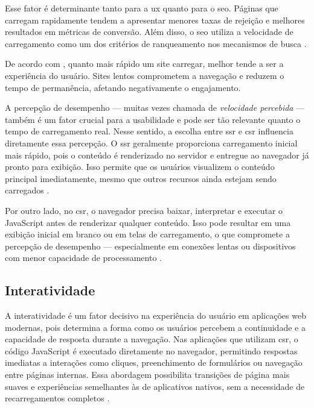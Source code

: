 Esse fator é determinante tanto para a \acrshort{ux} quanto para o \acrshort{seo}. Páginas que carregam rapidamente tendem a apresentar menores taxas de rejeição e melhores resultados em métricas de conversão. Além disso, o \acrshort{seo} utiliza a velocidade de carregamento como um dos critérios de ranqueamento nos mecanismos de busca \cite{conor2022}.

De acordo com , quanto mais rápido um site carregar, melhor tende a ser a experiência do usuário. Sites lentos comprometem a navegação e reduzem o tempo de permanência, afetando negativamente o engajamento.

A percepção de desempenho — muitas vezes chamada de \emph{velocidade percebida} — também é um fator crucial para a usabilidade e pode ser tão relevante quanto o tempo de carregamento real. Nesse sentido, a escolha entre \acrshort{ssr} e \acrshort{csr} influencia diretamente essa percepção. O \acrshort{ssr} geralmente proporciona carregamento inicial mais rápido, pois o conteúdo é renderizado no servidor e entregue ao navegador já pronto para exibição. Isso permite que os usuários visualizem o conteúdo principal imediatamente, mesmo que outros recursos ainda estejam sendo carregados \cite{atori2024}.

Por outro lado, no \acrshort{csr}, o navegador precisa baixar, interpretar e executar o JavaScript antes de renderizar qualquer conteúdo. Isso pode resultar em uma exibição inicial em branco ou em telas de carregamento, o que compromete a percepção de desempenho — especialmente em conexões lentas ou dispositivos com menor capacidade de processamento \cite{pixelfree2023}.


\subsection{Interatividade}
\label{subsec:interatividade}

A interatividade é um fator decisivo na experiência do usuário em aplicações web modernas, pois determina a forma como os usuários percebem a continuidade e a capacidade de resposta durante a navegação. Nas aplicações que utilizam \acrshort{csr}, o código JavaScript é executado diretamente no navegador, permitindo respostas imediatas a interações como cliques, preenchimento de formulários ou navegação entre páginas internas. Essa abordagem possibilita transições de página mais suaves e experiências semelhantes às de aplicativos nativos, sem a necessidade de recarregamentos completos \cite{pixelfree2023}.

